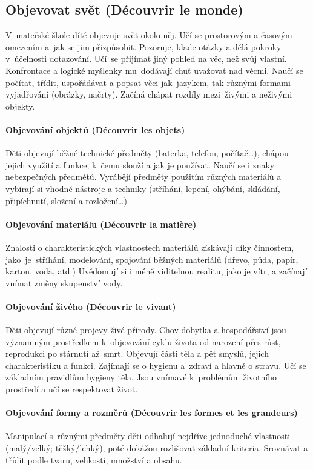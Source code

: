 		\subsection{Objevovat svět (Découvrir le monde)}
			V mateřské škole dítě objevuje svět okolo něj. Učí se prostorovým a časovým omezením a jak se jim přizpůsobit. Pozoruje, klade otázky a dělá pokroky v účelnosti dotazování. Učí se přijímat jiný pohled na věc, než svůj vlastní.  Konfrontace a logické myšlenky mu dodávají chuť uvažovat nad věcmi. Naučí se počítat, třídit, uspořádávat a popsat věci jak jazykem, tak různými formami vyjadřování (obrázky, načrty). Začíná chápat rozdíly mezi živými a neživými objekty.

			\paragraph{Objevování objektů (Découvrir les objets)}
				Děti objevují běžné technické předměty (baterka, telefon, počítač…), chápou jejich využití a funkce; k čemu slouží a jak je používat. Naučí se i znaky nebezpečných předmětů.
				Vyrábějí předměty použitím různých materiálů a vybírají si vhodné nástroje a techniky (stříhání, lepení, ohýbání, skládání, připíchnutí, složení a rozložení…)
			\paragraph{Objevování materiálu (Découvrir la matière)}
				Znalosti o charakteristických vlastnostech materiálů získávají díky činnostem, jako je stříhání, modelování, spojování běžných materiálů (dřevo, půda, papír, karton, voda, atd.)
				Uvědomují si i méně viditelnou realitu, jako je vítr, a začínají vnímat změny skupenství vody. 
			\paragraph{Objevování živého (Découvrir le vivant)} 
				Děti objevují různé projevy živé přírody. Chov dobytka a hospodářství jsou významným prostředkem k objevování cyklu života od narození přes růst, reprodukci po stárnutí až smrt.
				Objevují části těla a pět smyslů, jejich charakteristiku a funkci. Zajímají se o hygienu a zdraví a hlavně o stravu. Učí se základním pravidlům hygieny těla. 
				Jsou vnímavé k problémům životního prostředí a učí se respektovat život. 
			\paragraph{Objevování formy a rozměrů (Découvrir les formes et les grandeurs)}
				Manipulací s různými předměty děti odhalují nejdříve jednoduché vlastnosti (malý/velký; těžký/lehký), poté dokážou rozlišovat základní kriteria. Srovnávat a třídit podle tvaru, velikosti, množství a obsahu.
